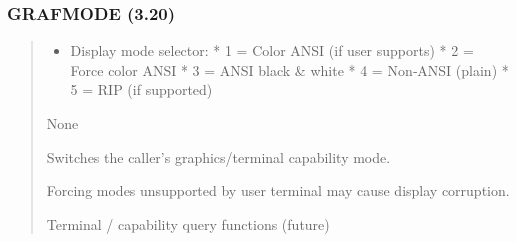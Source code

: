 \documentclass[letterpaper,10pt,english]{sphinxmanual}
\begin{document}
\subsubsection{GRAFMODE (3.20)}
\label{\detokenize{ppl:grafmode-3-20}}\begin{quote}

\sphinxAtStartPar
{}
\begin{description}
\begin{itemize}
\item {} 
\sphinxAtStartPar
{} \textendash{} Display mode selector:
* 1 = Color ANSI (if user supports)
* 2 = Force color ANSI
* 3 = ANSI black \& white
* 4 = Non‑ANSI (plain)
* 5 = RIP (if supported)

\end{itemize}

\sphinxAtStartPar
None

\sphinxAtStartPar
Switches the caller’s graphics/terminal capability mode.

\end{description}

\sphinxAtStartPar
{}
\begin{quote}

\begin{sphinxVerbatim}[commandchars=\\\{\}]
 
 
\end{sphinxVerbatim}
\end{quote}
\begin{description}
\sphinxAtStartPar
Forcing modes unsupported by user terminal may cause display corruption.

\sphinxAtStartPar
Terminal / capability query functions (future)

\end{description}
\end{quote}
\end{document}
